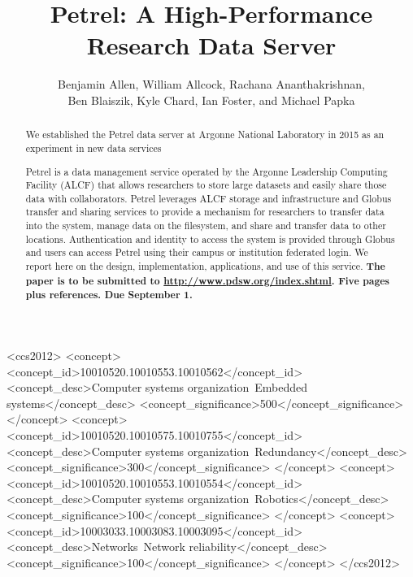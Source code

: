 \documentclass[sigconf]{acmart}
\begin{document}
\title{Petrel: A High-Performance Research Data Server}

\author{Benjamin Allen, William Allcock, Rachana Ananthakrishnan,\\Ben Blaiszik, Kyle Chard, Ian Foster, and Michael Papka}
\renewcommand{\shortauthors}{B. Allen et al.}


\begin{abstract}
We established the Petrel data server at Argonne National Laboratory in 2015 as an experiment in new data services  


Petrel is a data management service operated by the Argonne Leadership Computing Facility (ALCF)
that allows researchers to store large datasets and easily share those data with collaborators. 
Petrel leverages ALCF
storage and infrastructure and Globus transfer and sharing services to provide a mechanism for researchers to transfer data into the system, manage data on the filesystem, and share and transfer data to other locations. Authentication and identity to access the system is provided through Globus and users can access Petrel using their campus or institution federated login.
We report here on the design, implementation, applications, and use of this service.
\textbf{The paper is to be submitted to \url{http://www.pdsw.org/index.shtml}. Five pages plus references. Due September 1.}
\end{abstract}

%
%
\begin{CCSXML}
<ccs2012>
 <concept>
  <concept_id>10010520.10010553.10010562</concept_id>
  <concept_desc>Computer systems organization~Embedded systems</concept_desc>
  <concept_significance>500</concept_significance>
 </concept>
 <concept>
  <concept_id>10010520.10010575.10010755</concept_id>
  <concept_desc>Computer systems organization~Redundancy</concept_desc>
  <concept_significance>300</concept_significance>
 </concept>
 <concept>
  <concept_id>10010520.10010553.10010554</concept_id>
  <concept_desc>Computer systems organization~Robotics</concept_desc>
  <concept_significance>100</concept_significance>
 </concept>
 <concept>
  <concept_id>10003033.10003083.10003095</concept_id>
  <concept_desc>Networks~Network reliability</concept_desc>
  <concept_significance>100</concept_significance>
 </concept>
</ccs2012>  
\end{CCSXML}
\end{document}
